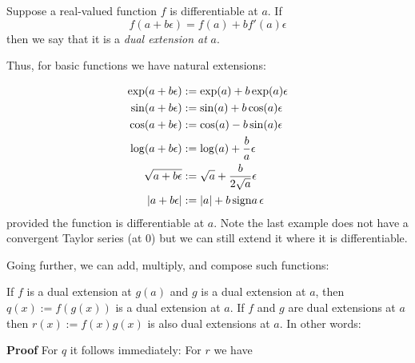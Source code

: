 \begin{definition} Suppose a real-valued function $f$ is differentiable at $a$. If
\[
f(a + b \ensuremath{\epsilon}) = f(a) + b f'(a) \ensuremath{\epsilon}
\]
then we say that it is a \emph{dual extension at} $a$.

Thus, for basic functions we have natural extensions:


\begin{align*}
\exp(a + b \ensuremath{\epsilon}) &:= \exp(a) + b \exp(a) \ensuremath{\epsilon} \\
\sin(a + b \ensuremath{\epsilon}) &:= \sin(a) + b \cos(a) \ensuremath{\epsilon} \\
\cos(a + b \ensuremath{\epsilon}) &:= \cos(a) - b \sin(a) \ensuremath{\epsilon} \\
\log(a + b \ensuremath{\epsilon}) &:= \log(a) + {b \over a} \ensuremath{\epsilon} \\
\sqrt{a+b \ensuremath{\epsilon}} &:= \sqrt{a} + {b \over 2 \sqrt{a}} \ensuremath{\epsilon} \\
|a + b \ensuremath{\epsilon}| &:= |a| + b\, {\rm sign} a\, \ensuremath{\epsilon}
\end{align*}
provided the function is differentiable at $a$. Note the last example does not have a convergent Taylor series (at 0) but we can still extend it where it is differentiable.

Going further, we can add, multiply, and compose such functions:

\begin{lemma} If $f$ is a dual extension at $g(a)$ and $g$ is a dual extension at $a$, then $q(x) := f(g(x))$ is a dual extension at $a$. If $f$ and $g$ are dual extensions at $a$ then  $r(x) := f(x) g(x)$ is also dual extensions at $a$. In other words:
\end{lemma}
\textbf{Proof} For $q$ it follows immediately:
For $r$ we have
\end{definition}

